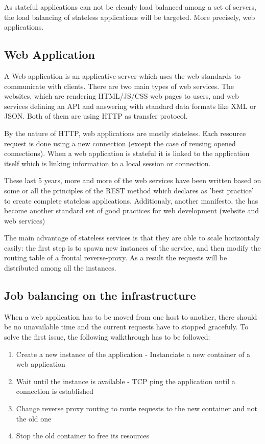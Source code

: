 As stateful applications can not be cleanly load balanced among a set of
servers, the load balancing of stateless applications will be targeted. More
precisely, web applications.

\subsection{Web Application}

A Web application is an applicative server which uses the web standards to
communicate with clients. There are two main types of web services. The
websites, which are rendering HTML/JS/CSS web pages to users, and web services
defining an API and answering with standard data formats like XML or JSON. Both
of them are using HTTP as transfer protocol.

By the nature of HTTP, web applications are mostly stateless. Each resource
request is done using a new connection (except the case of reusing opened
connections). When a web application is stateful it is linked to the
application itself which is linking information to a local session or
connection.

These last 5 years, more and more of the web services have been written based
on some or all the principles of the REST method which declares as 'best
practice' to create complete stateless applications. Additionaly, another
manifesto, the \cite{website12Factors} has become another standard set of good
practices for web development (website and web services)

The main advantage of stateless services is that they are able to scale
horizontaly easily: the first step is to spawn new instances of the service,
and then modify the routing table of a frontal reverse-proxy. As a result the
requests will be distributed among all the instances.

\subsection{Job balancing on the infrastructure}

When a web application has to be moved from one host to another, there should
be no unavailable time and the current requests have to stopped gracefuly. To
solve the first issue, the following walkthrough has to be followed:

\begin{enumerate}
	\item{Create a new instance of the application - Instanciate a new
	container of a web application}
	\item{Wait until the instance is available - TCP ping the application
	until a connection is established}
	\item{Change reverse proxy routing to route requests to the new
	container and not the old one}
	\item{Stop the old container to free its resources}
\end{enumerate}

